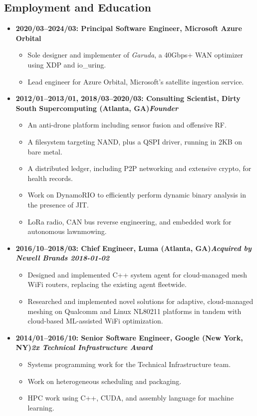 \documentclass{article}
\newenvironment{tightitemize}
{\begin{itemize}
  \setlength{\itemsep}{1pt}
  \setlength{\parskip}{0pt}
  \setlength{\parsep}{0pt}}
{\end{itemize}}
\begin{document}
\vspace{2mm}
\subsection*{Employment and Education}
\begin{tightitemize}
  \item \textbf{2020/03--2024/03: Principal Software Engineer, Microsoft Azure Orbital}
\begin {tightitemize}
\item Sole designer and implementer of \textit{Garuda}, a 40Gbps+ WAN optimizer using XDP and io\_uring.
\item Lead engineer for Azure Orbital, Microsoft's satellite ingestion service.
\end{tightitemize}

\item \textbf{2012/01--2013/01, 2018/03--2020/03: Consulting Scientist, Dirty South Supercomputing (Atlanta, GA)\hfill \tiny{\textit{Founder}}}
\begin{tightitemize}
\item An anti-drone platform including sensor fusion and offensive RF.
\item A filesystem targeting NAND, plus a QSPI driver, running in 2KB on bare metal.
\item A distributed ledger, including P2P networking and extensive crypto, for health records.
\item Work on DynamoRIO to efficiently perform dynamic binary analysis in the presence of JIT.
\item LoRa radio, CAN bus reverse engineering, and embedded work for autonomous lawnmowing.
\end{tightitemize}

\item \textbf{2016/10--2018/03: Chief Engineer, Luma (Atlanta, GA)\hfill \tiny{\textit{Acquired by Newell Brands 2018-01-02}}}
\begin{tightitemize}
\item Designed and implemented C++ system agent for cloud-managed mesh
	WiFi routers, replacing the existing agent fleetwide.
\item Researched and implemented novel solutions for adaptive, cloud-managed
	meshing on Qualcomm and Linux NL80211 platforms in tandem with
	cloud-based ML-assisted WiFi optimization.
\end{tightitemize}

\item \textbf{2014/01--2016/10: Senior Software Engineer, Google (New York, NY)\hfill \tiny{\textit{2x Technical Infrastructure Award}}}
\begin{tightitemize}
\item Systems programming work for the Technical Infrastructure team.
\item Work on heterogeneous scheduling and packaging.
\item HPC work using C++, CUDA, and assembly language for machine learning.
\end{tightitemize}


\end{tightitemize}
\end{document}
